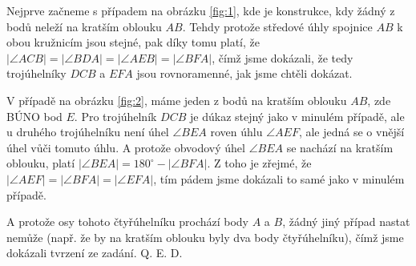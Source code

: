 \documentclass{fkssolpub}
\begin{document}
Nejprve začneme s případem na obrázku \ref{fig:1}, kde je konstrukce, kdy žádný z bodů neleží na kratším oblouku $AB$. Tehdy protože středové úhly spojnice $AB$ k obou kružnicím jsou stejné, pak díky tomu platí, že $|\angle ACB| = |\angle BDA| = |\angle AEB| = |\angle BFA|$, čímž jsme dokázali, že tedy trojúhelníky $DCB$ a $EFA$ jsou rovnoramenné, jak jsme chtěli dokázat.

V případě na obrázku \ref{fig:2}, máme jeden z bodů na kratším oblouku $AB$, zde BÚNO bod $E$. Pro trojúhelník $DCB$ je dúkaz stejný jako v minulém případě, ale u druhého trojúhelníku není úhel $\angle BEA$ roven úhlu $\angle AEF$, ale jedná se o vnější úhel vůči tomuto úhlu. A protože obvodový úhel $\angle BEA$ se nachází na kratším oblouku, platí $|\angle BEA| = 180^{\circ} - |\angle BFA|$. Z toho je zřejmé, že $|\angle AEF| = |\angle BFA| = |\angle EFA|$, tím pádem jsme dokázali to samé jako v minulém případě.

A protože osy tohoto čtyřúhelníku prochází body $A$ a $B$, žádný jiný případ nastat nemůže (např. že by na kratším oblouku byly dva body čtyřúhelníku), čímž jsme dokázali tvrzení ze zadání. Q. E. D.
\end{document}
